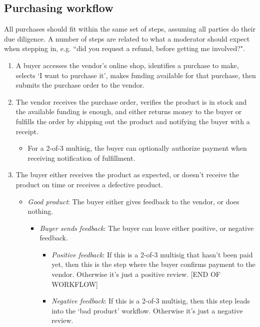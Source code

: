 \subsection{Purchasing workflow}
\label{subsec:escrowed-marketplace-purchasing-workflow}

All purchases should fit within the same set of steps, assuming all parties do their due diligence. A number of steps are related to what a moderator should expect when stepping in, e.g. ``did you request a refund, before getting me involved?".
\begin{enumerate}
    \item A buyer accesses the vendor's online shop, identifies a purchase to make, selects `I want to purchase it', makes funding available for that purchase, then submits the purchase order to the vendor.
    \item The vendor receives the purchase order, verifies the product is in stock and the available funding is enough, and either returns money to the buyer or fulfills the order by shipping out the product and notifying the buyer with a receipt.
    \begin{itemize}
        \item For a 2-of-3 multisig, the buyer can optionally authorize payment when receiving notification of fulfillment.
    \end{itemize}{}
    \item The buyer either receives the product as expected, or doesn't receive the product on time or receives a defective product.
    \begin{itemize}
        \item {\em Good product}: The buyer either gives feedback to the vendor, or does nothing.
        \begin{itemize}
            \item {\em Buyer sends feedback}: The buyer can leave either positive, or negative feedback.
            \begin{itemize}
                \item {\em Positive feedback}: If this is a 2-of-3 multisig that hasn't been paid yet, then this is the step where the buyer confirms payment to the vendor. Otherwise it's just a positive review. [END OF WORKFLOW]
                \item {\em Negative feedback}: If this is a 2-of-3 multisig, then this step leads into the `bad product' workflow. Otherwise it's just a negative review.
            \end{itemize}{}

\end{itemize}
\end{itemize}
\end{enumerate}
